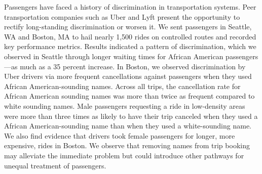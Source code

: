 Passengers have faced a history of discrimination in transportation systems. Peer transportation companies such as Uber and Lyft present the opportunity to rectify long-standing discrimination or worsen it. We sent passengers in Seattle, WA and Boston, MA to hail nearly 1,500 rides on controlled routes and recorded key performance metrics. Results indicated a pattern of discrimination, which we observed in Seattle through longer waiting times for African American passengers—as much as a 35 percent increase. In Boston, we observed discrimination by Uber drivers via more frequent cancellations against passengers when they used African American-sounding names. Across all trips, the cancellation rate for African American sounding names was more than twice as frequent compared to white sounding names. Male passengers requesting a ride in low-density areas were more than three times as likely to have their trip canceled when they used a African American-sounding name than when they used a white-sounding name. We also find evidence that drivers took female passengers for longer, more expensive, rides in Boston. We observe that removing names from trip booking may alleviate the immediate problem but could introduce other pathways for unequal treatment of passengers.